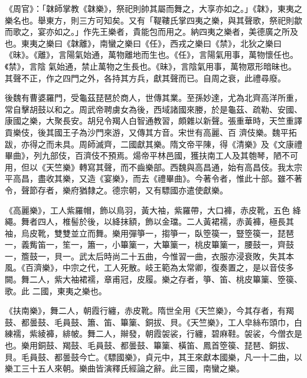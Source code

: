 \begin{pinyinscope}
 《周官》：「韎師掌教《韎樂》，祭祀則帥其屬而舞之，大享亦如之。」《韎》，東夷之樂名也。舉東方，則三方可知矣。又有「鞮鞻氏掌四夷之樂，與其聲歌，祭祀則歙而歌之，宴亦如之。」作先王樂者，貴能包而用之。納四夷之樂者，美德廣之所及也。東夷之樂曰《韎離》，南蠻之樂曰《任》，西戎之樂曰《禁》，北狄之樂曰《昧》。《離》，言陽氣始通，萬物離地而生也。《任》，言陽氣用事，萬物懷任也。《禁》，言陰
 氣始通，禁止萬物之生長也。《昧》，言陰氣用事，萬物眾形暗昧也。其聲不正，作之四門之外，各持其方兵，獻其聲而已。自周之衰，此禮尋廢。



 後魏有曹婆羅門，受龜茲琵琶於商人，世傳其業。至孫妙達，尤為北齊高洋所重，常自擊胡鼓以和之。周武帝聘虜女為後，西域諸國來媵，於是龜茲、疏勒、安國、康國之樂，大聚長安。胡兒令羯人白智通教習，頗雜以新聲。張重華時，天竺重譯貢樂伎，後其國王子為沙門來游，又傳其方音。宋世有高麗、百
 濟伎樂。魏平拓跋，亦得之而未具。周師滅齊，二國獻其樂。隋文帝平陳，得《清樂》及《文康禮畢曲》，列九部伎，百濟伎不預焉。煬帝平林邑國，獲扶南工人及其匏琴，陋不可用，但以《天竺樂》轉寫其聲，而不齒樂部。西魏與高昌通，始有高昌伎。我太宗平高昌，盡收其樂，又造《宴樂》，而去《禮畢曲》。今著令者，惟此十部。雖不著令，聲節存者，樂府猶隸之。德宗朝，又有驃國亦遣使獻樂。



 《高麗樂》，工人紫羅帽，飾以鳥羽，黃大袖，紫羅帶，大口褲，赤皮靴，五色
 絳繩。舞者四人，椎髻於後，以絳抹額，飾以金璫。二人黃裙襦，赤黃褲，極長其袖，烏皮靴，雙雙並立而舞。樂用彈箏一，搊箏一，臥箜篌一，豎箜篌一，琵琶一，義觜笛一，笙一，簫一，小篳篥一，大篳篥一，桃皮篳篥一，腰鼓一，齊鼓一，簷鼓一，貝一。武太后時尚二十五曲，今惟習一曲，衣服亦浸衰敗，失其本風。《百濟樂》，中宗之代，工人死散。岐王範為太常卿，復奏置之，是以音伎多闕。舞二人，紫大袖裙襦，章甫冠，皮履。樂之存者，箏、笛、桃皮篳篥、箜篌、歌。此
 二國，東夷之樂也。



 《扶南樂》，舞二人，朝霞行纏，赤皮靴。隋世全用《天竺樂》，今其存者，有羯鼓、都曇鼓、毛員鼓、簫、笛、篳篥、銅拔、貝。《天竺樂》，工人皁絲布頭巾，白練襦，紫綾褲，緋帔。舞二人，辮發，朝霞袈裟，行纏，碧麻鞋。袈裟，今僧衣是也。樂用銅鼓、羯鼓、毛員鼓、都曇鼓、篳篥、橫笛、鳳首箜篌、琵琶、銅拔、貝。毛員鼓、都曇鼓今亡。《驃國樂》，貞元中，其王來獻本國樂，凡一十二曲，以樂工三十五人來朝。樂曲皆演釋氏經論之辭。此三國，南蠻之樂。




\end{pinyinscope}
